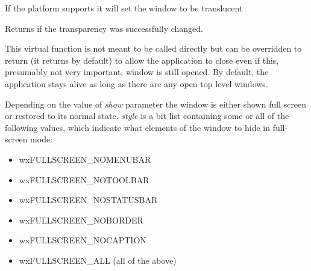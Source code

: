 



\label{wxtoplevelwindowsettransparent}


If the platform supports it will set the window to be translucent



Returns \true if the transparency was successfully changed.



\label{wxtoplevelwindowshouldpreventappexit}


This virtual function is not meant to be called directly but can be overridden
to return \false (it returns \true by default) to allow the application to
close even if this, presumably not very important, window is still opened.
By default, the application stays alive as long as there are any open top level
windows.


\label{wxtoplevelwindowshowfullscreen}


Depending on the value of {\it show} parameter the window is either shown full
screen or restored to its normal state. {\it style} is a bit list containing
some or all of the following values, which indicate what elements of the window
to hide in full-screen mode:

\begin{itemize}\itemsep=0pt
\item wxFULLSCREEN\_NOMENUBAR
\item wxFULLSCREEN\_NOTOOLBAR
\item wxFULLSCREEN\_NOSTATUSBAR
\item wxFULLSCREEN\_NOBORDER
\item wxFULLSCREEN\_NOCAPTION
\item wxFULLSCREEN\_ALL (all of the above)
\end{itemize}

